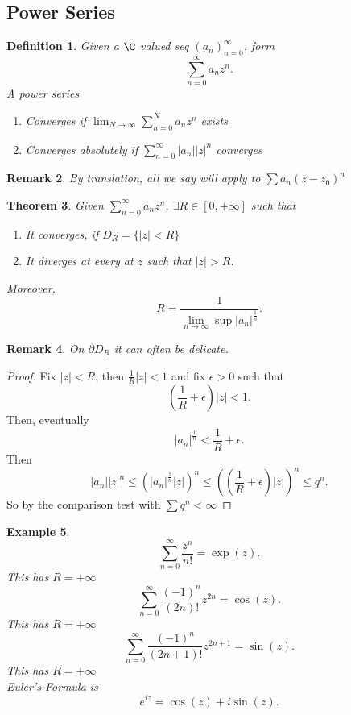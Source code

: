 \documentclass[a4paper]{article}
\newtheorem{thm}{Theorem}[section]
\newtheorem{defn}[thm]{Definition}
\newtheorem{eg}[thm]{Example}
\newtheorem{rmk}[thm]{Remark}
\begin{document}
\subsection{Power Series}
\begin{defn}
    Given a $\C$ valued seq $(a_n)_{n=0}^\infty$, form \[
    \sum_{n=0}^\infty a_nz^n
    .\] 
    A power series 
    \begin{enumerate}
        \item Converges if $\lim_{N\to \infty}\sum_{n=0}^N a_nz^n$ exists 
        \item Converges absolutely if $\sum_{n=0}^\infty |a_n||z|^n$ converges
    \end{enumerate}
\end{defn}
\begin{rmk}
    By translation, all we say will apply to $\sum a_n(z-z_0)^n$
\end{rmk}
\begin{thm}
    Given $\sum_{n=0}^\infty a_nz^n$, $\exists R\in [0,+\infty]$ such that 
    \begin{enumerate}
        \item It converges, if $D_R= \{|z|<R\}$
        \item It diverges at every at $z$ such that $|z|>R$. 
    \end{enumerate}
    Moreover, \[
    R=\frac{1}{\lim_{n\to\infty}\sup|a_n|^{\frac{1}{n}}} \tag{Hadamard's Formula}
    .\] 
\end{thm}
\begin{rmk}
    On $\partial D_R$ it can often be delicate.
\end{rmk}
\begin{proof}
    Fix $|z|<R$, then $\frac{1}{R}|z|<1$ and fix $\epsilon>0$ such that \[
    \left( \frac{1}{R}+\epsilon \right)|z|<1
    .\] 
    Then, eventually \[
    |a_n|^{\frac{1}{n}}<\frac{1}{R}+\epsilon
    .\] 
    Then \[
    |a_n||z|^n\leq \left( |a_n|^{\frac{1}{n}}|z| \right)^n \leq \left( \left (\frac{1}{R}+\epsilon\right )|z| \right)^n\leq q^n
    .\]
    So by the comparison test with $\sum q^n<\infty$
\end{proof}
\begin{eg}
    \[
    \sum_{n=0}^{\infty} \frac{z^n}{n!}=\exp(z)
    .\] 
    This has $R=+\infty$
    \[
    \sum_{n=0}^{\infty}\frac{(-1)^n}{(2n)!}z^{2n}=\cos(z)
    .\] 
    This has $R=+\infty$
    \[
    \sum_{n=0}^{\infty}\frac{(-1)^n}{(2n+1)!}z^{2n+1}=\sin(z)
    .\] 
    This has $R=+\infty$\\
    Euler's Formula is 
    \[
    e^{iz}=\cos(z)+i\sin(z)
    .\] 
\end{eg}
\end{document}
